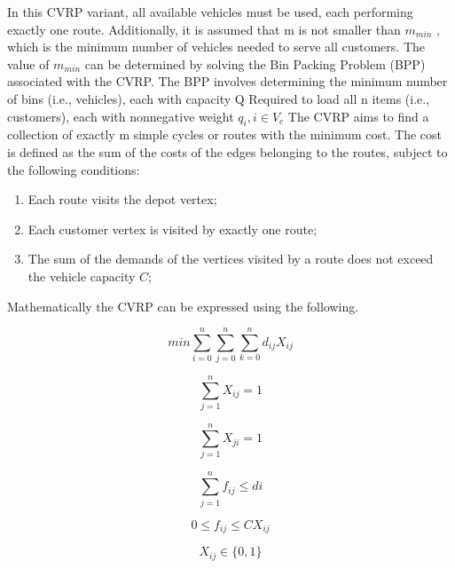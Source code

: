\documentclass[conference]{IEEEtran}
\begin{document}
\begin{abstract1}
In this CVRP variant, all available vehicles must be used, each performing exactly one route. Additionally, it is assumed that m is not smaller than $m_{min}$ , which is the minimum number of vehicles needed to serve all customers. The value of $m_{min}$ can be determined by solving the Bin Packing Problem (BPP) associated with the CVRP. The BPP involves determining the minimum number of bins (i.e., vehicles), each with capacity Q Required to load all n items (i.e., customers), each with nonnegative weight $q_{i},i \in V_{c}$
The CVRP aims to find a collection of exactly m simple cycles or routes with the minimum cost. The cost is defined as the sum of the costs of the edges belonging to the routes, subject to the following conditions:

\begin{enumerate}
	\item Each route visits the depot vertex;
	\item Each customer vertex is visited by exactly one route;
	\item The sum of the demands of the vertices visited by a route does not exceed the vehicle capacity $C$;
\end{enumerate}




Mathematically the CVRP can be expressed using the following.


\begin{equation}
min\sum_{i=0}^n\sum_{j=0}^n\sum_{k=0}^nd_{ij}X_{ij}
\end{equation}

\begin{equation}
\sum_{j=1}^nX_{ij} = 1
\end{equation}

\begin{equation}
\sum_{j=1}^nX_{ji} = 1
\end{equation}

\begin{equation}
\sum_{j=1}^nf_{ij} \leq di
\end{equation}
 
 \begin{equation}
0\leq f_{ij}\leq CX_{ij}
 \end{equation}
 
  \begin{equation}
X_{ij} \in \{0,1\}
 \end{equation}
 

   
   

\end{abstract1}
\end{document}
